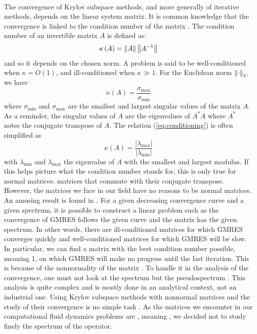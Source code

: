       \paragraph{}
      The convergence of Krylov subspace methods, and more generally of iterative methods, depends on the linear system matrix.
      It is common knowledge that the convergence is linked to the condition number of the matrix \cite{Nevanlinna1994}.
      The condition number of an invertible matrix $A$ is defined as:
      \begin{equation}
        \kappa\left( A \right) = \norm{A} \norm{A^{-1}}
      \end{equation}
      and so it depends on the chosen norm.
      A problem is said to be well-conditioned when $\kappa = O\left(1\right)$, and ill-conditioned when $\kappa \gg 1$.
      For the Euclidean norm $\norm[2]{\cdot}$, we have
  		\begin{equation}\label{eq:conditioning}
  			\kappa\left( A \right) = \frac{\sigma_{\max}}{\sigma_{\min}}
  		\end{equation}
      where $\sigma_{\min}$ and $\sigma_{\max}$ are the smallest and largest singular values of the matrix $A$.
      As a reminder, the singular values of $A$ are the eigenvalues of $A^* A$ where $A^*$ notes the conjugate transpose of $A$.
      The relation (\ref{eq:conditioning}) is often simplified as
      \begin{equation}
        \kappa\left( A \right) = \frac{\left|\lambda_{\max}\right|}{\left|\lambda_{\min}\right|}
      \end{equation}
      with $\lambda_{\min}$ and $\lambda_{\max}$ the eigenvalue of $A$ with the smallest and largest modulus.
      If this helps picture what the condition number stands for, this is only true for normal matrices: matrices that commute with their conjugate transpose.
      However, the matrices we face in our field have no reasons to be normal matrices.
      An amusing result is found in \cite{GreenbaumPtakStrakos1996}.
      For a given decreasing convergence curve and a given spectrum, it is possible to construct a linear problem such as the convergence of GMRES follows the given curve and the matrix has the given spectrum.
      In other words, there are ill-conditioned matrices for which GMRES converges quickly and well-conditioned matrices for which GMRES will be slow.
      In particular, we can find a matrix with the best condition number possible, meaning 1, on which GMRES will make no progress until the last iteration.
      This is because of the nonnormality of the matrix \cite{GreenbaumStrakos1994, GreenbaumPtakStrakos1996}.
      To handle it in the analysis of the convergence, one must not look at the spectrum but the pseudospectrum \cite{Trefethen1999}.
      This analysis is quite complex and is mostly done in an analytical context, not an industrial one.
      Using Krylov subspace methods with nonnormal matrices and the study of their convergence is no simple task \cite{LiesenTichy2004, Huhtanen2005}.
      As the matrices we encounter in our computational fluid dynamics problems are , meaning , we decided not to study finely the spectrum of the operator.

